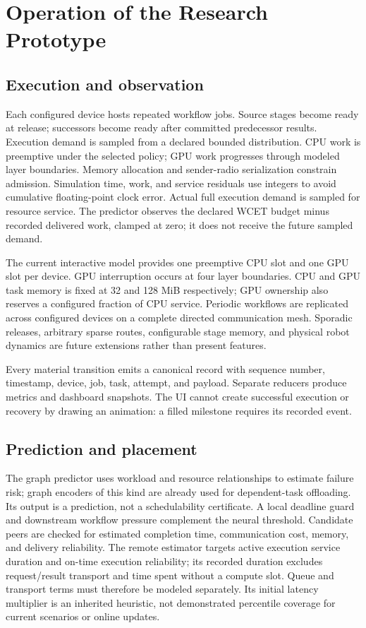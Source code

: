 \documentclass[11pt,a4paper]{article}
\begin{document}
\section{Operation of the Research Prototype}
\subsection{Execution and observation}
Each configured device hosts repeated workflow jobs. Source stages become ready
at release; successors become ready after committed predecessor results.
Execution demand is sampled from a declared bounded distribution. CPU work is
preemptive under the selected policy; GPU work progresses through modeled layer
boundaries. Memory allocation and sender-radio serialization constrain admission.
Simulation time, work, and service residuals use integers to avoid cumulative
floating-point clock error. Actual full execution demand is sampled for resource
service. The predictor observes the declared WCET budget minus recorded delivered
work, clamped at zero; it does not receive the future sampled demand.

The current interactive model provides one preemptive CPU slot and one GPU slot
per device. GPU interruption occurs at four layer boundaries. CPU and GPU task
memory is fixed at 32 and 128 MiB respectively; GPU ownership also reserves a
configured fraction of CPU service. Periodic workflows are replicated across
configured devices on a complete directed communication mesh. Sporadic releases,
arbitrary sparse routes, configurable stage memory, and physical robot dynamics
are future extensions rather than present features.

Every material transition emits a canonical record with sequence number,
timestamp, device, job, task, attempt, and payload. Separate reducers produce
metrics and dashboard snapshots. The UI cannot create successful execution or
recovery by drawing an animation: a filled milestone requires its recorded event.

\subsection{Prediction and placement}
The graph predictor uses workload and resource relationships to estimate failure
risk; graph encoders of this kind are already used for dependent-task
offloading\cite{chen2026,kaur2025}. Its output is a prediction, not a schedulability certificate. A local
deadline guard and downstream workflow pressure complement the neural threshold.
Candidate peers are checked for estimated completion time, communication cost,
memory, and delivery reliability. The remote estimator targets active execution service duration and on-time
execution reliability; its recorded duration excludes request/result transport
and time spent without a compute slot. Queue and transport terms must therefore
be modeled separately. Its initial latency multiplier is an inherited heuristic,
not demonstrated percentile coverage for current scenarios or online updates.
\end{document}
